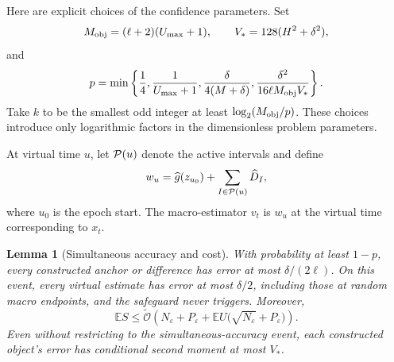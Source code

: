 \documentclass[11pt,a4paper]{article}
\newcommand{\E}{\mathbb{E}}
\newcommand{\eps}{\varepsilon}
\newcommand{\tO}{\widetilde{\mathcal{O}}}
\newtheorem{lemma}[theorem]{Lemma}
\theoremstyle{remark}
\begin{document}
Here are explicit choices of the confidence parameters.  Set
\begin{equation}
 M_{\rm obj}=(\ell+2)(U_{\max}+1),\qquad
 V_*=128(H^2+\delta^2),
 \label{eq:dyadic-object-envelope}
\end{equation}
and
\begin{equation}
 p=\min\left\{\frac14,\frac1{U_{\max}+1},
       \frac{\delta}{4(M+\delta)},
       \frac{\delta^2}{16\ell M_{\rm obj}V_*}\right\}.
 \label{eq:dyadic-failure-budget}
\end{equation}
Take $k$ to be the smallest odd integer at least
$\log_2(M_{\rm obj}/p)$.  These choices introduce only logarithmic factors
in the dimensionless problem parameters.

At virtual time $u$, let ${\cal P}(u)$ denote the active intervals and define
\begin{equation}
 w_u=\widehat g(z_{u_0})+
           \sum_{I\in{\cal P}(u)}\widehat D_I,
 \label{eq:dyadic-estimator}
\end{equation}
where $u_0$ is the epoch start.  The macro-estimator $v_t$ is $w_u$ at the
virtual time corresponding to $x_t$.

\begin{lemma}[Simultaneous accuracy and cost]
\label{lem:dyadic-invariant}
With probability at least $1-p$, every constructed anchor or difference has
error at most $\delta/(2\ell)$.  On this event, every virtual estimate has
error at most $\delta/2$, including those at random macro endpoints, and the
safeguard never triggers.  Moreover,
\begin{equation}
 \E S\le\tO\left(N_\eps+P_\eps+
            \E U\bigl(\sqrt{N_\eps}+P_\eps\bigr)\right).
 \label{eq:dyadic-path-cost}
\end{equation}
Even without restricting to the simultaneous-accuracy event, each
constructed object's error has conditional second moment at most $V_*$.
\end{lemma}
\end{document}

